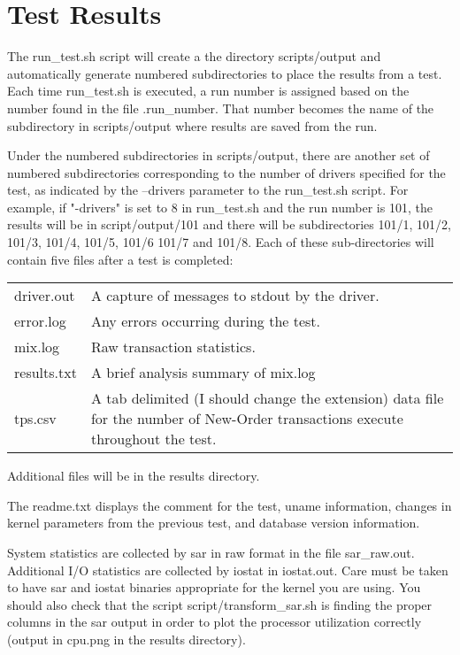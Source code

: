 \documentclass{article}
\begin{document}
\section{Test Results}

The run\_test.sh script will create a the directory scripts/output and
automatically generate numbered subdirectories to place the results from a
test.  Each time run\_test.sh is executed, a run number is assigned based on
the number found in the file .run\_number.  That number becomes the name of
the subdirectory in scripts/output where results are saved from the run.

Under the numbered subdirectories in scripts/output, there are another set of
numbered subdirectories corresponding to the number of drivers specified for
the test, as indicated by the --drivers parameter to the run\_test.sh script.
For example, if "-drivers" is set to 8 in run\_test.sh and the run number is
101, the results will be in script/output/101 and there will be subdirectories
101/1, 101/2, 101/3, 101/4, 101/5, 101/6 101/7 and 101/8.  Each of these
sub-directories will contain five files after a test is completed: \\
\begin{tabular}[c]{ll}
driver.out & A capture of messages to stdout by the driver. \\
error.log & Any errors occurring during the test. \\
mix.log & Raw transaction statistics. \\
results.txt & A brief analysis summary of mix.log \\
tps.csv & A tab delimited (I should change the extension) data file for the
          number of New-Order transactions execute throughout the test. \\
\end{tabular}

Additional files will be in the results directory.

The readme.txt displays the comment for the test, uname  information, changes
in kernel parameters from the previous test, and database version information.

System statistics are collected by sar in raw format in the file sar\_raw.out.
Additional I/O statistics are collected by iostat in iostat.out.  Care must be
taken to have sar and iostat binaries appropriate for the kernel you are
using.  You should also check that the script script/transform\_sar.sh is
finding the proper columns in the sar output in order to plot the processor
utilization correctly (output in cpu.png in the results directory).
\end{document}
